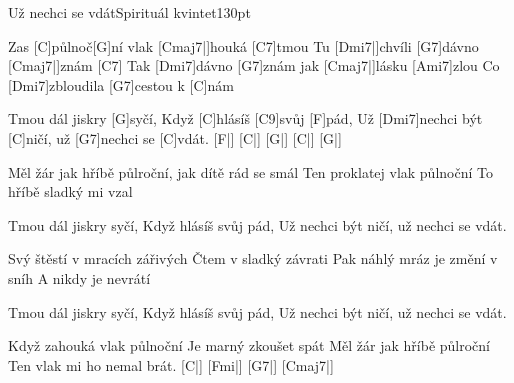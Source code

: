 \begin{song}{Už nechci se vdát}{Spirituál kvintet}{130pt}

%
Zas [C]půlnoč[G]ní vlak [Cmaj7|]{houká} [C7]tmou
Tu [Dmi7|]{chvíli} [G7]dávno [Cmaj7|]{znám} [C7]{}
Tak [Dmi7]dávno [G7]znám jak [Cmaj7|]{lásku} [Ami7]zlou
Co [Dmi7]zbloudila [G7]cestou k [C]nám

\chorus%
Tmou dál jiskry [G]syčí,
Když [C]hlásíš [C9]svůj [F]pád,
Už [Dmi7]nechci být [C]ničí,
už [G7]nechci se [C]vdát. [F|]{} [C|]{} [G|]{} [C|]{} [G|]{}

%
Měl žár jak hříbě půlroční,
jak dítě rád se smál
Ten proklatej vlak půlnoční
To hříbě sladký mi vzal

\chorus%
Tmou dál jiskry syčí,
Když hlásíš svůj pád,
Už nechci být ničí,
už nechci se vdát.

%
Svý štěstí v mracích zářivých
Čtem v sladký závrati
Pak náhlý mráz je změní v sníh
A nikdy je nevrátí

\chorus%
Tmou dál jiskry syčí,
Když hlásíš svůj pád,
Už nechci být ničí,
už nechci se vdát.

%
Když zahouká vlak půlnoční
Je marný zkoušet spát
Měl žár jak hříbě půlroční
Ten vlak mi ho nemal brát.
[C|]{} [Fmi|]{} [G7|]{} [Cmaj7|]{}
\end{song}
